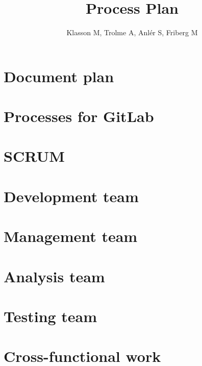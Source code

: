 \documentclass[12pt]{article}
\title{\Huge Process Plan}
\author{Klasson M, Trolme A, Anlér S, Friberg M}
\begin{document}




    \section{Document plan}
    

    \clearpage
    \section{Processes for GitLab}
    

    \pagebreak
    \section{SCRUM}
    
    
    \pagebreak
    \section{Development team}
    
   
    \pagebreak
    \section{Management team}
    
    
    \pagebreak
    \section{Analysis team}
    
    
    \pagebreak
    \section{Testing team}
    
 
    \pagebreak
    \section{Cross-functional work}
    
    
\end{document}
